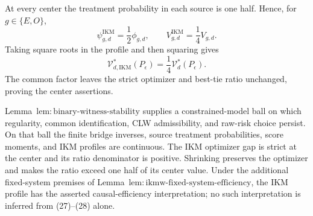 At every center the treatment probability in each source is one half. Hence, for \(g\in\{E,O\}\),
\[
 \psi_{g,d}^{\mathrm{IKM}}=\frac12\phi_{g,d},
 \qquad
 V_{g,d}^{\mathrm{IKM}}=\frac14V_{g,d}.                   \tag{27}
\]
Taking square roots in the profile and then squaring gives
\[
 \mathcal V_{d,\mathrm{IKM}}^*(P_\epsilon)
 =\frac14\mathcal V_d^*(P_\epsilon).                      \tag{28}
\]
The common factor leaves the strict optimizer and best-tie ratio unchanged, proving the center assertions.

Lemma~\(\mathrm{lem{:}binary\text{-}witness\text{-}stability}\) supplies a constrained-model ball on which regularity, common identification, CLW admissibility, and raw-risk choice persist. On that ball the finite bridge inverses, source treatment probabilities, score moments, and IKM profiles are continuous. The IKM optimizer gap is strict at the center and its ratio denominator is positive. Shrinking preserves the optimizer and makes the ratio exceed one half of its center value. Under the additional fixed-system premises of Lemma~\(\mathrm{lem{:}ikmw\text{-}fixed\text{-}system\text{-}efficiency}\), the IKM profile has the asserted causal-efficiency interpretation; no such interpretation is inferred from (27)--(28) alone.